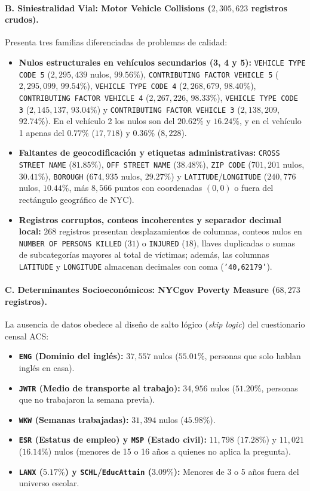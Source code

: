 \documentclass[11pt,a4paper]{article}
\begin{document}
\paragraph{B. Siniestralidad Vial: Motor Vehicle Collisions ($2,305,623$ registros crudos).}
Presenta tres familias diferenciadas de problemas de calidad:
\begin{itemize}
    \item \textbf{Nulos estructurales en vehículos secundarios (3, 4 y 5):} \texttt{VEHICLE TYPE CODE 5} ($2,295,439$ nulos, $99.56\%$), \texttt{CONTRIBUTING FACTOR VEHICLE 5} ($2,295,099$, $99.54\%$), \texttt{VEHICLE TYPE CODE 4} ($2,268,679$, $98.40\%$), \texttt{CONTRIBUTING FACTOR VEHICLE 4} ($2,267,226$, $98.33\%$), \texttt{VEHICLE TYPE CODE 3} ($2,145,137$, $93.04\%$) y \texttt{CONTRIBUTING FACTOR VEHICLE 3} ($2,138,209$, $92.74\%$). En el vehículo 2 los nulos son del $20.62\%$ y $16.24\%$, y en el vehículo 1 apenas del $0.77\%$ ($17,718$) y $0.36\%$ ($8,228$).
    \item \textbf{Faltantes de geocodificación y etiquetas administrativas:} \texttt{CROSS STREET NAME} ($81.85\%$), \texttt{OFF STREET NAME} ($38.48\%$), \texttt{ZIP CODE} ($701,201$ nulos, $30.41\%$), \texttt{BOROUGH} ($674,935$ nulos, $29.27\%$) y \texttt{LATITUDE}/\texttt{LONGITUDE} ($240,776$ nulos, $10.44\%$, más $8,566$ puntos con coordenadas $(0,0)$ o fuera del rectángulo geográfico de NYC).
    \item \textbf{Registros corruptos, conteos incoherentes y separador decimal local:} $268$ registros presentan desplazamientos de columnas, conteos nulos en \texttt{NUMBER OF PERSONS KILLED} ($31$) o \texttt{INJURED} ($18$), llaves duplicadas o sumas de subcategorías mayores al total de víctimas; además, las columnas \texttt{LATITUDE} y \texttt{LONGITUDE} almacenan decimales con coma (\texttt{'40,62179'}).
\end{itemize}

\paragraph{C. Determinantes Socioeconómicos: NYCgov Poverty Measure ($68,273$ registros).}
La ausencia de datos obedece al diseño de salto lógico (\textit{skip logic}) del cuestionario censal ACS:
\begin{itemize}
    \item \textbf{\texttt{ENG} (Dominio del inglés):} $37,557$ nulos ($55.01\%$, personas que solo hablan inglés en casa).
    \item \textbf{\texttt{JWTR} (Medio de transporte al trabajo):} $34,956$ nulos ($51.20\%$, personas que no trabajaron la semana previa).
    \item \textbf{\texttt{WKW} (Semanas trabajadas):} $31,394$ nulos ($45.98\%$).
    \item \textbf{\texttt{ESR} (Estatus de empleo) y \texttt{MSP} (Estado civil):} $11,798$ ($17.28\%$) y $11,021$ ($16.14\%$) nulos (menores de 15 o 16 años a quienes no aplica la pregunta).
    \item \textbf{\texttt{LANX} ($5.17\%$) y \texttt{SCHL}/\texttt{EducAttain} ($3.09\%$):} Menores de 3 o 5 años fuera del universo escolar.
\end{itemize}
\end{document}
